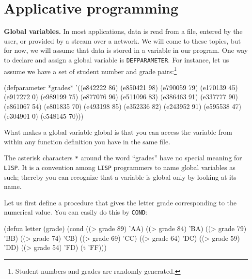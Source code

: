 \documentclass[a4paper,11pt]{article}
\begin{document}
\noindent\hrulefill

\newpage

\section{Applicative programming}

\begin{uenum}

\item {\bf Global variables.} In most applications, data is read from a file, entered by the user, or provided by a stream over a network. We will come to these topics, but for now, we will assume that data is stored in a  variable in our program. One way to declare and assign a global variable is \Verb+DEFPARAMETER+. For instance, let us assume we have a set of student number and grade pairs:\footnote{Student numbers and grades are randomly generated.}

\begin{lispcode}
(defparameter *grades* 
  '((e842222 86) (e850421 98) (e790059 79) (e170139 45)
    (e917272 0)  (e989199 75) (e877076 96) (e511096 83)
    (e386463 91) (e337777 90) (e861067 54) (e801835 70)
    (e493198 85) (e352336 82) (e243952 91) (e595538 47)
    (e304901 0)  (e548145 70)))
\end{lispcode}

\begin{uenumi}
\item What makes a global variable global is that you can access the variable from within any function definition you have in the same file. 
\item The asterisk characters \Verb+*+ around the word ``grades'' have no special meaning for \Verb+LISP+. It is a convention among \Verb+LISP+ programmers to name global variables as such; thereby you can recognize that a variable is global only by looking at its name.
\end{uenumi}


\item Let us first define a procedure that gives the letter grade corresponding to the numerical value. You can easily do this by \Verb+COND+: 

\begin{lispcode}
(defun letter (grade)
  (cond ((> grade 89) 'AA)
        ((> grade 84) 'BA)
        ((> grade 79) 'BB)
        ((> grade 74) 'CB)
        ((> grade 69) 'CC)
        ((> grade 64) 'DC)
        ((> grade 59) 'DD)
        ((> grade 54) 'FD)
        (t 'FF)))
\end{lispcode}


\end{uenum}
\end{document}
